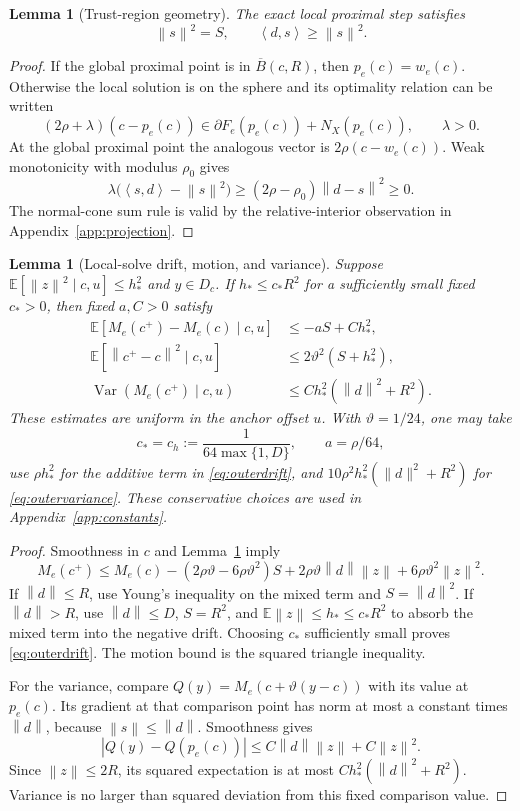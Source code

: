 \documentclass[11pt,a4paper]{article}
\newcommand{\E}{\mathbb E}
\newcommand{\norm}[1]{\left\lVert#1\right\rVert}
\newcommand{\ip}[2]{\left\langle#1,#2\right\rangle}
\DeclareMathOperator{\Var}{Var}
\newtheorem{lemma}[theorem]{Lemma}
\theoremstyle{remark}
\numberwithin{equation}{section}
\begin{document}
\begin{lemma}[Trust-region geometry]\label{lem:geometry}
The exact local proximal step satisfies
\[
 \norm s^2=S,\qquad \ip ds\ge\norm s^2.
\]
\end{lemma}
\begin{proof}
If the global proximal point is in $\overline B(c,R)$, then $p_e(c)=w_e(c)$. Otherwise the local solution is on the sphere and its optimality relation can be written
\[
 (2\rho+\lambda)(c-p_e(c))\in\partial F_e(p_e(c))+N_X(p_e(c)),\qquad\lambda>0.
\]
At the global proximal point the analogous vector is $2\rho(c-w_e(c))$. Weak monotonicity with modulus $\rho_0$ gives
\[
 \lambda\bigl(\ip sd-\norm s^2\bigr)
 \ge(2\rho-\rho_0)\norm{d-s}^2\ge0.
\]
The normal-cone sum rule is valid by the relative-interior observation in Appendix~\ref{app:projection}.
\end{proof}

\begin{lemma}[Local-solve drift, motion, and variance]\label{lem:outerdrift}
Suppose $\E[\norm z^2\mid c,u]\le h_*^2$ and $y\in D_c$. If $h_*\le c_*R^2$ for a sufficiently small fixed $c_*>0$, then fixed $a,C>0$ satisfy
\begin{align}
 \E[M_e(c^+)-M_e(c)\mid c,u]&\le-aS+C h_*^2,\label{eq:outerdrift}\\
 \E[\norm{c^+-c}^2\mid c,u]&\le2\vartheta^2(S+h_*^2),\label{eq:motion}\\
 \Var(M_e(c^+)\mid c,u)&\le C h_*^2(\norm d^2+R^2).
 \label{eq:outervariance}
\end{align}
These estimates are uniform in the anchor offset $u$. With $\vartheta=1/24$, one may take
\[
 c_* = c_h:=\frac1{64\max\{1,D\}},\qquad
 a=\rho/64,
\]
use $\rho h_*^2$ for the additive term in \eqref{eq:outerdrift}, and $10\rho^2h_*^2(\|d\|^2+R^2)$ for \eqref{eq:outervariance}. These conservative choices are used in Appendix~\ref{app:constants}.
\end{lemma}
\begin{proof}
Smoothness in $c$ and Lemma~\ref{lem:geometry} imply
\[
 M_e(c^+)\le M_e(c)-(2\rho\vartheta-6\rho\vartheta^2)S
 +2\rho\vartheta\norm d\norm z+6\rho\vartheta^2\norm z^2.
\]
If $\norm d\le R$, use Young's inequality on the mixed term and $S=\norm d^2$. If $\norm d>R$, use $\norm d\le D$, $S=R^2$, and $\E\norm z\le h_*\le c_*R^2$ to absorb the mixed term into the negative drift. Choosing $c_*$ sufficiently small proves \eqref{eq:outerdrift}. The motion bound is the squared triangle inequality.

For the variance, compare $Q(y)=M_e(c+\vartheta(y-c))$ with its value at $p_e(c)$. Its gradient at that comparison point has norm at most a constant times $\norm d$, because $\norm s\le\norm d$. Smoothness gives
\[
 |Q(y)-Q(p_e(c))|\le C\norm d\norm z+C\norm z^2.
\]
Since $\norm z\le2R$, its squared expectation is at most
$C h_*^2(\norm d^2+R^2)$. Variance is no larger than squared deviation from this fixed comparison value.
\end{proof}
\end{document}
